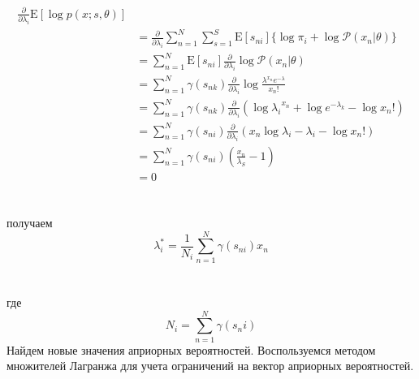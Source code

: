 \documentclass{matmex-diploma-custom}
\begin{document}
\begin{align*}
\frac{\partial}{\partial \lambda_i}\mathrm{E}[\log p(x;s,\theta)]\\
&=\frac{\partial}{\partial \lambda_i}\sum_{n=1}^N \sum_{s=1}^S
\mathrm{E}[s_{ni}]\{\log \pi_i + \log \mathcal{P}(x_n|\theta)\}\\
&= \sum_{n=1}^N \mathrm{E}[s_{ni}] \frac{\partial}{\partial \lambda_i} \log \mathcal{P}(x_n|\theta)\\
&= \sum_{n=1}^N \gamma(s_{nk}) \frac{\partial}{\partial \lambda_i} \log {\frac{\lambda^{x_n} e^{-\lambda}}{x_n!}}\\
&= \sum_{n=1}^N \gamma(s_{nk}) \frac{\partial}{\partial \lambda_i} (\log {\lambda_i}^{x_n} + \log e^{-\lambda_k} - \log x_n! )\\
&= \sum_{n=1}^N \gamma(s_{ni}) \frac{\partial}{\partial \lambda_i} (x_n \log \lambda_i - \lambda_i - \log x_n! )\\
&= \sum_{n=1}^N \gamma(s_{ni}) (\frac{x_n}{\lambda_S} - 1)\\
&= 0
\end{align*}
\\\\
получаем
\begin{equation}
\lambda_i^* = \frac{1}{N_i}\sum_{n=1}^N\gamma(s_{ni})x_n
\end{equation}
\\\\
где
\begin{equation}
N_i = \sum_{n=1}^N\gamma(s_ni)
\end{equation}
Найдем новые значения априорных вероятностей.
Воспользуемся методом множителей Лагранжа для учета ограничений на вектор априорных вероятностей.
\end{document}

